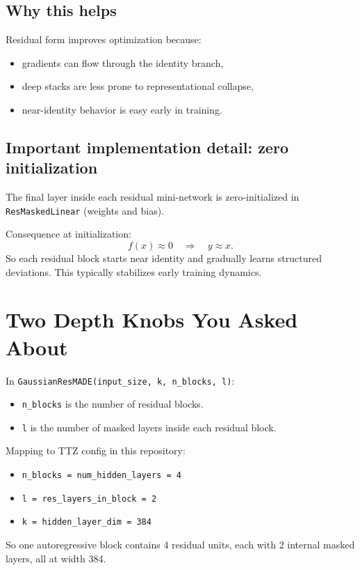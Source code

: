 \documentclass[11pt]{article}
\begin{document}
\subsection*{Why this helps}
Residual form improves optimization because:
\begin{itemize}[leftmargin=*]
\item gradients can flow through the identity branch,
\item deep stacks are less prone to representational collapse,
\item near-identity behavior is easy early in training.
\end{itemize}

\subsection*{Important implementation detail: zero initialization}
The final layer inside each residual mini-network is zero-initialized in
\texttt{ResMaskedLinear} (weights and bias).

Consequence at initialization:
\[
f(x) \approx 0 \quad\Rightarrow\quad y \approx x.
\]
So each residual block starts near identity and gradually learns structured
deviations. This typically stabilizes early training dynamics.

\section{Two Depth Knobs You Asked About}
In \texttt{GaussianResMADE(input\_size, k, n\_blocks, l)}:
\begin{itemize}[leftmargin=*]
\item \texttt{n\_blocks} is the number of residual blocks.
\item \texttt{l} is the number of masked layers inside each residual block.
\end{itemize}

Mapping to TTZ config in this repository:
\begin{itemize}[leftmargin=*]
\item \texttt{n\_blocks = num\_hidden\_layers = 4}
\item \texttt{l = res\_layers\_in\_block = 2}
\item \texttt{k = hidden\_layer\_dim = 384}
\end{itemize}

So one autoregressive block contains 4 residual units, each with 2 internal
masked layers, all at width 384.
\end{document}
